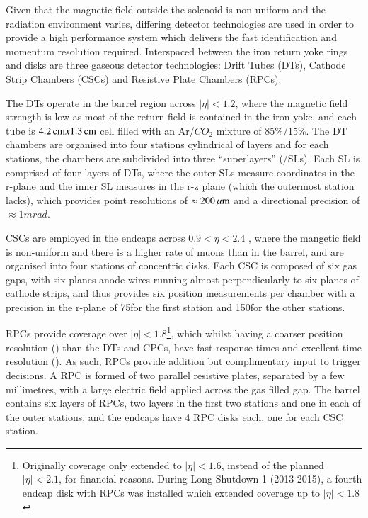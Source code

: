 Given that the magnetic field outside the solenoid is non-uniform and the radiation environment varies, differing detector technologies are used in order to provide a high performance system which delivers the fast identification and momentum resolution required. 
Interspaced between the iron return yoke rings and disks are three gaseous detector technologies: Drift Tubes (DTs), Cathode Strip Chambers (CSCs) and Resistive Plate Chambers (RPCs).

The DTs operate in the barrel region across $|\eta| < 1.2$, where the magnetic field strength is low as most of the return field is contained in the iron yoke,	and each tube is $4.2\,\text{cm} x 1.3\,\text{cm}$ cell filled with an Ar/$CO_{2}$ mixture of 85\%/15\%.
The DT chambers are organised into four stations cylindrical of layers and for each stations, the chambers are subdivided into three ``superlayers'' (/SLs).
Each SL is comprised of four layers of DTs, where the outer SLs measure coordinates in the r-\phi plane and the inner SL measures in the r-z plane (which the outermost station lacks), which provides point resolutions of $\approx 200\,\mu\text{m}$ and a \phi directional precision of $\approx 1 mrad$.

CSCs are employed in the endcaps across $0.9 < \eta < 2.4$ , where the mangetic field is non-uniform and there is a higher rate of muons than in the barrel, and are organised into four stations of concentric disks.
Each CSC is composed of six gas gaps, with six planes anode wires running almost perpendicularly to six planes of cathode strips, and thus provides six position measurements per chamber with a precision in the r-\phi plane of 75\mum for the first station and 150\mum for the other stations\cite{CMS:1997iti}.

RPCs provide coverage over $|\eta| < 1.8$\footnote{Originally coverage only extended to $|\eta| < 1.6$, instead of the planned $|\eta| < 2.1$, for financial reasons. During Long Shutdown 1 (2013-2015), a fourth endcap disk with RPCs was installed which extended coverage up to $|\eta| < 1.8$\cite{Battilana:2017mrm}}, which whilst having a coarser position resolution (\cm) than the DTs and CPCs, have fast response times and excellent time resolution (\ns).
As such, RPCs provide addition but complimentary input to trigger decisions.
A RPC is formed of two parallel resistive plates, separated by a few millimetres, with a large electric field applied across the gas filled gap.
The barrel contains six layers of RPCs, two layers in the first two stations and one in each of the outer stations, and the endcaps have 4 RPC disks each, one for each CSC station.

